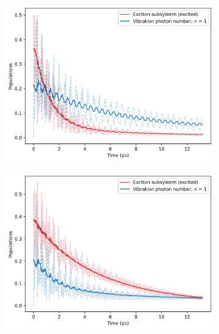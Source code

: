 \documentclass[11pt]{article}
\begin{document}
\begin{figure}[H]
    \centering
    \begin{subfigure}{0.45\textwidth}
        \centering
        \includegraphics[width=\linewidth]{Research Project/Code/results/ExVib/Open/Population/pops_ex_spont_eg.png}
        \caption{}
        \label{fig:EVM_OQS_Pop_spont_eg}
    \end{subfigure}
    \hfill
    \begin{subfigure}{0.45\textwidth}
        \centering
        \includegraphics[width=\linewidth]{Research Project/Code/results/ExVib/Open/Population/pops_ex_therm_eg.png}
        \caption{}
        \label{fig:EVM_OQS_Pop_therm_eg}
    \end{subfigure}
    

\end{figure}
\end{document}

